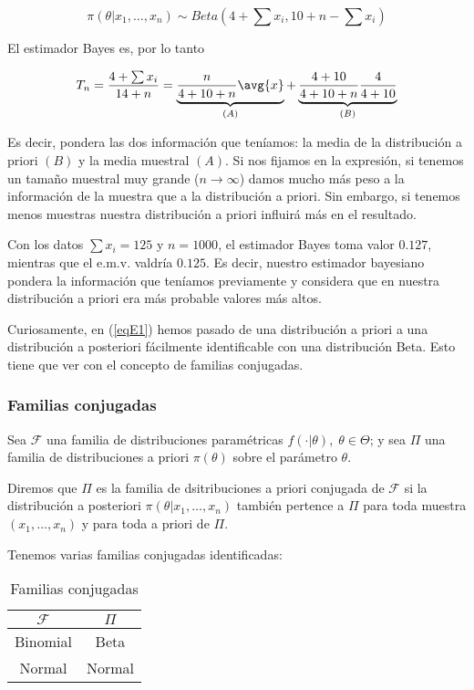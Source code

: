 \documentclass{apuntes}
\begin{document}
\[  \pi(\theta | x_1,\dotsc,x_n)  \sim Beta(4 + \sum x_i, 10 + n - \sum x_i) \]

El estimador Bayes es, por lo tanto

\[ T_n = \frac{4 + \sum x_i}{14 + n} = \underbrace{\frac{n}{4 + 10 + n}\avg{x}}_{(A)} + \underbrace{\frac{4+10}{4+10+n}\frac{4}{4+10}}_{(B)} \]

Es decir, pondera las dos información que teníamos: la media de la distribución a priori $(B)$ y la media muestral $(A)$. Si nos fijamos en la expresión, si tenemos un tamaño muestral muy grande ($n\to\infty$) damos mucho más peso a la información de la muestra que a la distribución a priori. Sin embargo, si tenemos menos muestras nuestra distribución a priori influirá más en el resultado.

Con los datos $\sum x_i = 125$ y $n = 1000$, el estimador Bayes toma valor $0.127$, mientras que el e.m.v. valdría $0.125$. Es decir, nuestro estimador bayesiano pondera la información que teníamos previamente y considera que en nuestra distribución a priori era más probable valores más altos.

Curiosamente, en (\ref{eqE1}) hemos pasado de una distribución a priori a una distribución a posteriori fácilmente identificable con una distribución Beta. Esto tiene que ver con el concepto de familias conjugadas.

\subsubsection{Familias conjugadas}

\begin{defn} Sea $\mathcal{F}$ una familia de distribuciones paramétricas $f(\cdot | \theta),\;\theta\in\Theta$; y sea $\Pi$ una familia de distribuciones a priori $\pi(\theta)$ sobre el parámetro $\theta$. 

Diremos que $\Pi$ es la familia de dsitribuciones a priori conjugada de $\mathcal{F}$ si la distribución a posteriori $ \pi(\theta | x_1,\dotsc,x_n) $ también pertence a $\Pi$ para toda muestra $ ( x_1,\dotsc,x_n) $ y para toda a priori de $\Pi$.
\end{defn}

Tenemos varias familias conjugadas identificadas:
\begin{table}[hbtp]
\centering
\begin{tabular}{|c|c|}
\hline
$\mathcal{F}$ & $\Pi$ \\
\hline 
Binomial & Beta \\ 
\hline 
Normal & Normal \\ 
\hline
\end{tabular} 
\caption{Familias conjugadas}
\end{table}
\end{document}
